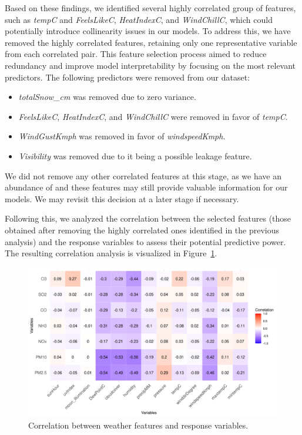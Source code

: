 \documentclass[twoside,11pt]{article}
\begin{document}
Based on these findings, we identified several highly correlated group of features, such as \textit{tempC} and \textit{FeelsLikeC}, \textit{HeatIndexC}, and \textit{WindChillC}, which could potentially introduce collinearity issues in our models. To address this, we have removed the highly correlated features, retaining only one representative variable from each correlated pair. This feature selection process aimed to reduce redundancy and improve model interpretability by focusing on the most relevant predictors. The following predictors were removed from our dataset:

\begin{itemize}
    \item \textit{totalSnow\_cm} was removed due to zero variance.
    \item \textit{FeelsLikeC}, \textit{HeatIndexC}, and \textit{WindChillC} were removed in favor of \textit{tempC}.
    \item \textit{WindGustKmph} was removed in favor of \textit{windspeedKmph}.
    \item \textit{Visibility} was removed due to it being a possible leakage feature.
\end{itemize}

We did not remove any other correlated features at this stage, as we have an abundance of and these features may still provide valuable information for our models. We may revisit this decision at a later stage if necessary.

Following this, we analyzed the correlation between the selected features (those obtained after removing the highly correlated ones identified in the previous analysis) and the response variables to assess their potential predictive power. The resulting correlation analysis is visualized in Figure~\ref{fig:feature_response_correlation}.

\begin{figure}[H]
  \centering
  \includegraphics[width=\textwidth]{assets/feature-response-correlation.png}
  \caption{Correlation between weather features and response variables.}
  \label{fig:feature_response_correlation}
\end{figure}
\end{document}
